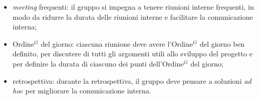 \begin{itemize}
\begin{itemize}
		      \item \textit{meeting} frequenti: il gruppo si impegna a
		            tenere riunioni interne frequenti, in modo da ridurre la
		            durata delle riunioni interne e facilitare la comunicazione
		            interna;

		      \item \gls{Ordine}$^G$ del giorno: ciascuna riunione deve avere l'\gls{Ordine}$^G$ del
		            giorno ben definito, per discutere di tutti gli argomenti
		            utili allo sviluppo del progetto e per definire la durata di
		            ciascuno dei punti dell'\gls{Ordine}$^G$ del giorno;

		      \item retrospettiva: durante la retrospettiva, il gruppo deve
		            pensare a soluzioni \textit{ad hoc} per migliorare la
		            comunicazione interna.
	      \end{itemize}
\end{itemize}

